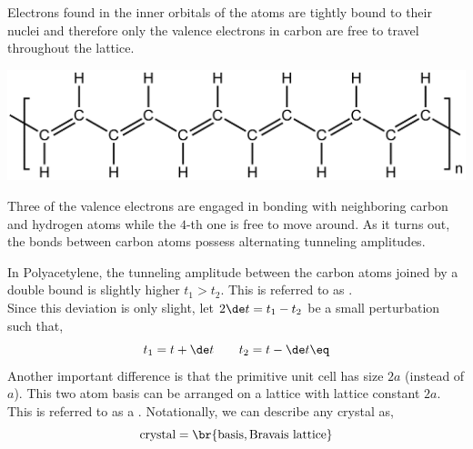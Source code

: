 \documentclass{article}
\begin{document}
Electrons found in the inner orbitals of the atoms are tightly bound to their nuclei and therefore only the valence electrons in carbon are free to travel throughout the lattice.

\begin{center}
    \includegraphics[width=\linewidth]{figures/polyacetylene.png}
\end{center}

Three of the valence electrons are engaged in bonding with neighboring carbon and hydrogen atoms while the $4$-th one is free to move around. As it turns out, the bonds between carbon atoms possess alternating tunneling amplitudes.

\begin{center}
\end{center}
In Polyacetylene, the tunneling amplitude between the carbon atoms joined by a double bound is slightly higher $t_1 > t_2$. This is referred to as . \\

Since this deviation is only slight, let $2\de t = t_1 - t_2$ be a small perturbation such that,
\[ t_1 = t + \de t \qquad t_2 = t - \de t \eq \label{eq:t1t2}\]
Another important difference is that the primitive unit cell has size $2a$ (instead of $a$). This two atom basis can be arranged on a lattice with lattice constant $2a$. This is referred to as a . Notationally, we can describe any crystal as,
\[ \text{crystal} = \br{\text{basis}, \text{Bravais lattice}} \]
\end{document}
